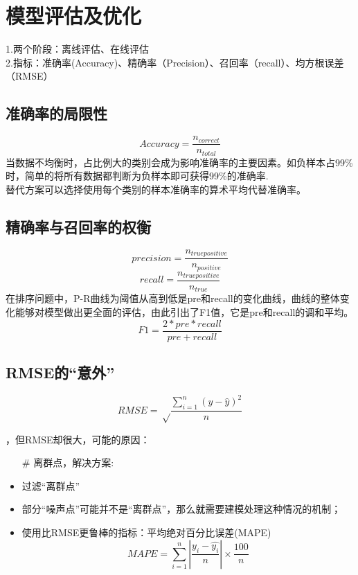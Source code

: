 \documentclass[UTF8]{article}%
\begin{document}
	\section{模型评估及优化}
		1.两个阶段：离线评估、在线评估\\
		2.指标：准确率(Accuracy)、精确率（Precision）、召回率（recall）、均方根误差（RMSE）\\
		\subsection{准确率的局限性}
		
		$$Accuracy=\frac{n_{correct}}{n_{total}}$$
		当数据不均衡时，占比例大的类别会成为影响准确率的主要因素。如负样本占99\%时，简单的将所有数据都判断为负样本即可获得99\%的准确率.\\
		替代方案可以选择使用每个类别的样本准确率的算术平均代替准确率。
		
		\subsection{精确率与召回率的权衡}
		$$precision=\frac{n_{truepositive}}{n_{positive}}$$
		$$recall=\frac{n_{truepositive}}{n_{true}}$$
		在排序问题中，P-R曲线为阈值从高到低是pre和recall的变化曲线，曲线的整体变化能够对模型做出更全面的评估，由此引出了F1值，它是pre和recall的调和平均。
		$$F1=\frac{2*pre*recall}{pre+recall}$$
		
		\subsection{RMSE的“意外”}
		$$RMSE=\sqrt\frac{\sum_{i=1}^{n}(y-\hat{y})^2}{n}$$
		\begin{enumerate}
			，但RMSE却很大，可能的原因：
			\begin{itemize}
				\item[\#] 离群点，解决方案:
					\item 过滤“离群点”
					\item 部分“噪声点”可能并不是“离群点”，那么就需要建模处理这种情况的机制；
					\item 使用比RMSE更鲁棒的指标：平均绝对百分比误差(MAPE)
				$$MAPE=\sum_{i=1}^{n}\left|\frac{y_i-\hat{y_i}}{n}\right|\times\frac{100}{n}$$
			\end{itemize}
		\end{enumerate}
	
\end{document}
